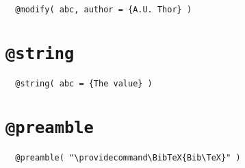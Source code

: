 \begin{verbatim}
  @modify( abc, author = {A.U. Thor} )
\end{verbatim}

\INCOMPLETE

\section{\texttt{@string}}

\begin{verbatim}
  @string( abc = {The value} )
\end{verbatim}

\INCOMPLETE

\section{\texttt{@preamble}}

\begin{verbatim}
  @preamble( "\providecommand\BibTeX{Bib\TeX}" )
\end{verbatim}

\INCOMPLETE


\endinput
%
